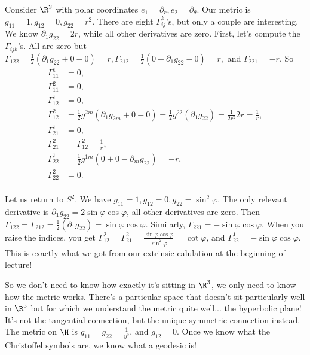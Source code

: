 \begin{example}
    Consider $\R^2$ with polar coordinates $e_1=\partial _r,e_2=\partial _{\theta}$. Our metric is $g_{11}=1,g_{12}=0,g_{22}=r^2$. There are eight $\Gamma _{ij}^k$'s, but only a couple are interesting. We know $\partial_1g_{22}=2r $, while all other derivatives are zero. First, let's compute the $\Gamma _{ijk}$'s. All are zero but $\Gamma _{122}=\frac{1}{2}(\partial_1g_{22}+0-0)=r,\Gamma _{212}=\frac{1}{2}(0+\partial_1g_{22}-0)=r, $ and $\Gamma _{221}=-r$. So
    \begin{align*}
        \Gamma _{11}^1&=0,\\
        \Gamma _{11}^2&=0,\\
        \Gamma _{12}^1&=0,\\
        \Gamma _{12}^2&=\frac{1}{2}g^{2m}(\partial_1g_{2m}+0-0) =\frac{1}{2}g^{22}(\partial_1g_{22})=\frac{1}{2r^2}2r=\frac{1}{r},\\
        \Gamma _{21}^1&=0,\\
        \Gamma _{21}^2&=\Gamma _{12}^2=\frac{1}{r},\\
        \Gamma _{22}^1&=\frac{1}{2}g^{1m}(0+0-\partial_mg_{22}) =-r,\\
        \Gamma _{22}^2&=0.\\
    \end{align*}
\end{example}

\begin{example}
    Let us return to $S^2$. We have $g_{11}=1,g_{12}=0,g_{22}=\sin ^2 \varphi $. The only relevant derivative is $\partial_1g_{22}=2 \sin \varphi  \cos \varphi  $, all other derivatives are zero. Then $\Gamma _{122}=\Gamma _{212}=\frac{1}{2}(\partial_1g_22)=\sin \varphi \cos \varphi  $. Similarly, $\Gamma _{221}=-\sin \varphi  \cos \varphi $. When you raise the indices, you get $\Gamma _{12}^2=\Gamma _{21}^2= \frac{\sin \varphi  \cos \varphi }{\sin ^2 \varphi }=\cot \varphi $, and $\Gamma _{22}^1=-\sin \varphi  \cos \varphi $. This is exactly what we got from our extrinsic calulation at the beginning of lecture!
\end{example}
So we don't need to know how exactly it's sitting in $\R^3$, we only need to know how the metric works. There's a particular space that doesn't sit particularly well in $\R^3$ but for which we understand the metric quite well... the hyperbolic plane! It's not the tangential connection, but the unique symmetric connection instead. The metric on $\H$ is $g_{11}=g_{22}=\frac{1}{y^2}$, and $g_{12}=0$. Once we know what the Christoffel symbols are, we know what a geodesic is!
